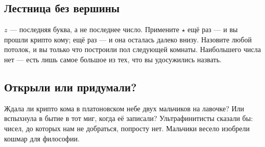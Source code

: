 \subsection{Лестница без вершины}
\(z\) --- последняя буква, а не последнее число. Примените \(\star\) ещё раз --- и вы прошли
крипто кому; ещё раз --- и она осталась далеко внизу. Назовите любой потолок, и вы только что
построили пол следующей комнаты. Наибольшего числа нет --- есть лишь самое большое из тех,
что вы удосужились назвать.

\subsection{Открыли или придумали?}
Ждала ли крипто кома в платоновском небе двух мальчиков на лавочке? Или вспыхнула в бытие в
тот миг, когда её записали? Ультрафинитисты сказали бы: чисел, до которых нам не добраться,
попросту нет. Мальчики весело изобрели кошмар для философии.
